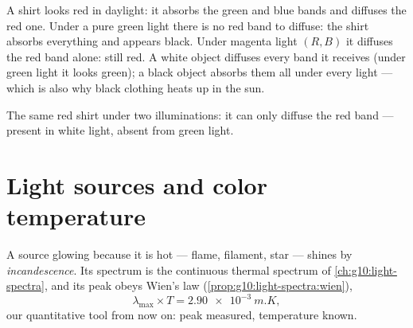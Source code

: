 \begin{example}\label{ex:g11:color-light-sources:redshirt}
A shirt looks red in daylight: it absorbs the green and blue bands and
diffuses the red one. Under a pure green light there is no red band to
diffuse: the shirt absorbs everything and appears black. Under magenta
light $(R, B)$ it diffuses the red band alone: still red. A white
object diffuses every band it receives (under green light it looks
green); a black object absorbs them all under every light --- which is
also why black clothing heats up in the sun.
\end{example}

\begin{omfigure}
\qquad
{}

{\small The same red shirt under two illuminations: it can only diffuse
the red band --- present in white light, absent from green light.}
\end{omfigure}

\section{Light sources and color temperature}

\begin{definition}\label{def:g11:color-light-sources:incandescent}
A source glowing because it is hot --- flame, filament, star --- shines
by \emph{incandescence}. Its spectrum is the
continuous thermal spectrum of \cref{ch:g10:light-spectra}, and its peak
obeys Wien's law (\cref{prop:g10:light-spectra:wien}),
\[
\lambda_{\max} \times T = \qty{2.90e-3}{m.K},
\]
our quantitative tool from now on: peak measured, temperature known.
\end{definition}


